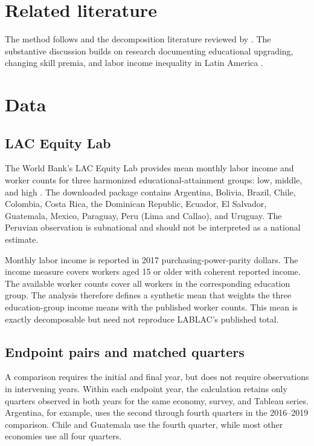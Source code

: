 \documentclass[11pt]{article}
\begin{document}
\section{Related literature}

The method follows \citet{kitagawa1955} and the decomposition literature
reviewed by \citet{fortinlemieuxfirpo2011}. The substantive discussion builds
on research documenting educational upgrading, changing skill premia, and
labor income inequality in Latin America
\citep{gasparinietal2011,azevedoetal2013,messinadasilva2019}.

\section{Data}

\subsection{LAC Equity Lab}

The World Bank's LAC Equity Lab provides mean monthly labor income and worker
counts for three harmonized educational-attainment groups: low, middle, and
high \citep{lablac}. The downloaded package contains Argentina, Bolivia,
Brazil, Chile, Colombia, Costa Rica, the Dominican Republic, Ecuador, El
Salvador, Guatemala, Mexico, Paraguay, Peru (Lima and Callao), and Uruguay.
The Peruvian observation is subnational and should not be interpreted as a
national estimate.

Monthly labor income is reported in 2017 purchasing-power-parity dollars. The
income measure covers workers aged 15 or older with coherent reported income.
The available worker counts cover all workers in the corresponding education
group. The analysis therefore defines a synthetic mean that weights the three
education-group income means with the published worker counts. This mean is
exactly decomposable but need not reproduce LABLAC's published total.

\subsection{Endpoint pairs and matched quarters}

A comparison requires the initial and final year, but does not require
observations in intervening years. Within each endpoint year, the calculation
retains only quarters observed in both years for the same economy, survey, and
Tableau series. Argentina, for example, uses the second through fourth
quarters in the 2016--2019 comparison. Chile and Guatemala use the fourth
quarter, while most other economies use all four quarters.
\end{document}
